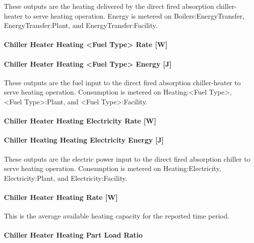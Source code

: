 These outputs are the heating delivered by the direct fired absorption chiller-heater to serve heating operation. Energy is metered on Boilers:EnergyTransfer, EnergyTransfer:Plant, and EnergyTransfer:Facility.

\paragraph{Chiller Heater Heating \textless{}Fuel Type\textgreater{} Rate {[}W{]}}\label{chiller-heater-heating-fuel-type-rate-w}

\paragraph{Chiller Heater Heating \textless{}Fuel Type\textgreater{} Energy {[}J{]}}\label{chiller-heater-heating-fuel-type-energy-j}

These outputs are the fuel input to the direct fired absorption chiller-heater to serve heating operation. Consumption is metered on Heating:\textless{}Fuel Type\textgreater{}, \textless{}Fuel Type\textgreater{}:Plant, and \textless{}Fuel Type\textgreater{}:Facility.

\paragraph{Chiller Heater Heating Electricity Rate {[}W{]}}\label{chiller-heater-heating-electric-power-w}

\paragraph{Chiller Heating Heating Electricity Energy {[}J{]}}\label{chiller-heating-heating-electric-energy-j}

These outputs are the electric power input to the direct fired absorption chiller to serve heating operation. Consumption is metered on Heating:Electricity, Electricity:Plant, and Electricity:Facility.

\paragraph{Chiller Heater Heating Rate {[}W{]}}\label{chiller-heater-heating-rate-w-1}

This is the average available heating capacity for the reported time period.

\paragraph{Chiller Heater Heating Part Load Ratio}\label{chiller-heater-heating-part-load-ratio}

